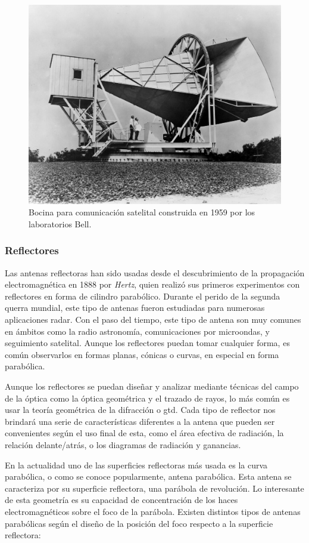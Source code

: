 \begin{figure}[h]
    \centering
        \includegraphics[width=12cm]{archivos/horn}
        \caption{Bocina para comunicación satelital construida en 1959 por los laboratorios Bell. \citep{NASA1962}}
        \label{fig:horn}
\end{figure}

\subsubsection{Reflectores}

\par Las antenas reflectoras han sido usadas desde el descubrimiento de la propagación electromagnética en 1888 por \textit{Hertz}, quien realizó sus primeros experimentos con reflectores en forma de cilindro parabólico. Durante el perido de la segunda querra mundial, este tipo de antenas fueron estudiadas para numerosas aplicaciones radar. Con el paso del tiempo, este tipo de antena son muy comunes en ámbitos como la radio astronomía, comunicaciones por microondas, y seguimiento satelital. Aunque los reflectores puedan tomar cualquier forma, es común observarlos en formas planas, cónicas o curvas, en especial en forma parabólica. 
\\
\par Aunque los reflectores se puedan diseñar y analizar mediante técnicas del campo de la óptica como la óptica geométrica y el trazado de rayos, lo más común es usar la teoría geométrica de la difracción o \gls{gtd}. Cada tipo de reflector nos brindará una serie de características diferentes a la antena que pueden ser convenientes según el uso final de esta, como el área efectiva de radiación, la relación delante/atrás, o los diagramas de radiación y ganancias.
\\
\par En la actualidad uno de las superficies reflectoras más usada es la curva parabólica, o como se conoce popularmente, antena parabólica. Esta antena se caracteriza por su superficie reflectora, una parábola de revolución. Lo interesante de esta geometría es su capacidad de concentración de los haces electromagnéticos sobre el foco de la parábola. Existen distintos tipos de antenas parabólicas según el diseño de la posición del foco respecto a la superficie reflectora:

